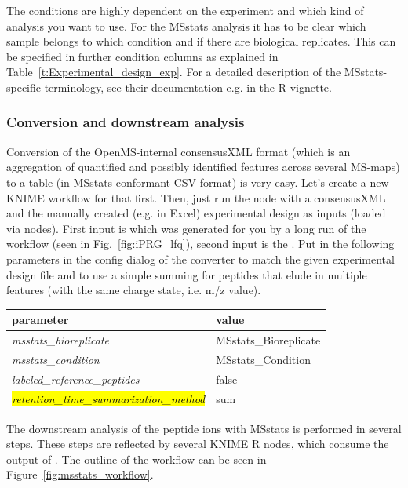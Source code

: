 \noindent The conditions are highly dependent on the experiment and which kind of analysis you want to use. For the MSstats analysis it has to be clear which sample belongs to which condition and if there are biological replicates. This can be specified in further condition columns as explained in Table~\ref{t:Experimental_design_exp}. For a detailed description of the MSstats-specific
terminology, see their documentation e.g. in the R vignette.

\subsubsection{Conversion and downstream analysis}
\label{sec:MSstatsConversion}

Conversion of the OpenMS-internal consensusXML format (which is an aggregation of quantified and possibly identified features across several MS-maps) to a table (in MSstats-conformant CSV format) is very easy. Let's create a new KNIME workflow for that first. Then, just run the  node with a consensusXML and the manually created (e.g. in Excel) experimental design as inputs (loaded via  nodes). First input is  which was generated for you by a long run of the  workflow (seen in Fig.~\ref{fig:iPRG_lfq}), second input is the . Put in the following parameters in the config dialog of the converter to match the given experimental design file and to use a simple summing for peptides that elude in multiple features (with the same charge state, i.e. m/z value).
\begin{center}
	\begin{tabular}{l|l}
		\textbf{parameter} & \textbf{value} \\ \hline
		\textit{msstats\_bioreplicate} & MSstats\_Bioreplicate \\
		\textit{msstats\_condition} & MSstats\_Condition \\
		\textit{labeled\_reference\_peptides} & false \\
		\hl{\textit{retention\_time\_summarization\_method}} & sum\\
	\end{tabular}
\end{center}

The downstream analysis of the peptide ions with MSstats is performed in several
steps. These steps are reflected by several KNIME R nodes, which consume
the output of . The outline of the workflow can be
seen in Figure~\ref{fig:msstats_workflow}.

